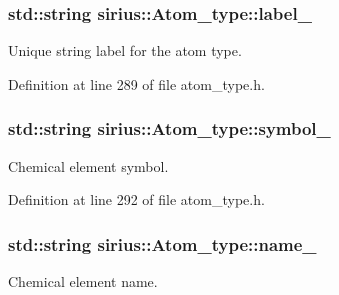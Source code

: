 \hypertarget{classsirius_1_1_atom__type_ad79bc28c0df0bc7819723e8013fba602}{}
\subsubsection[{label\+\_\+}]{\setlength{\rightskip}{0pt plus 5cm}std\+::string sirius\+::\+Atom\+\_\+type\+::label\+\_\+\hspace{0.3cm}{\ttfamily [private]}}\label{classsirius_1_1_atom__type_ad79bc28c0df0bc7819723e8013fba602}


Unique string label for the atom type. 



Definition at line 289 of file atom\+\_\+type.\+h.

\hypertarget{classsirius_1_1_atom__type_aa3090438a53985cf41d2ac57d92feda3}{}
\subsubsection[{symbol\+\_\+}]{\setlength{\rightskip}{0pt plus 5cm}std\+::string sirius\+::\+Atom\+\_\+type\+::symbol\+\_\+\hspace{0.3cm}{\ttfamily [private]}}\label{classsirius_1_1_atom__type_aa3090438a53985cf41d2ac57d92feda3}


Chemical element symbol. 



Definition at line 292 of file atom\+\_\+type.\+h.

\hypertarget{classsirius_1_1_atom__type_aaed973114158f85972d3aee81d4a5682}{}
\subsubsection[{name\+\_\+}]{\setlength{\rightskip}{0pt plus 5cm}std\+::string sirius\+::\+Atom\+\_\+type\+::name\+\_\+\hspace{0.3cm}{\ttfamily [private]}}\label{classsirius_1_1_atom__type_aaed973114158f85972d3aee81d4a5682}


Chemical element name. 



